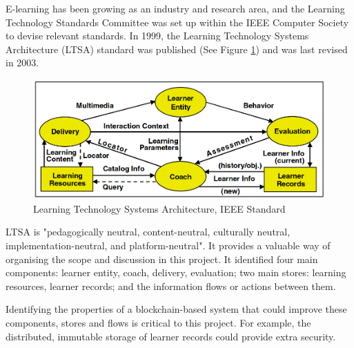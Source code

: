 E-learning has been growing as an industry and research area, and the Learning Technology Standards Committee
was set up within the IEEE Computer Society to devise relevant standards. In 1999, the Learning Technology
Systems Architecture (LTSA) standard was published (See Figure \ref{fig:LTSA}) and was last revised in 2003.

\begin{figure}[!ht]
	\centering
	\includegraphics[width=1.0\textwidth]{ltsa2003}
	\caption[Learning Technology Systems Architecture]
	{Learning Technology Systems Architecture, IEEE Standard \citep[p.9]{ieee2003ltsa}}
	\label{fig:LTSA}
\end{figure}

LTSA is "pedagogically neutral, content-neutral, culturally neutral, implementation-neutral,
and platform-neutral"\citep[p.1]{ieee2003ltsa}. It provides a valuable way of organising
the scope and discussion in this project. It identified four main components: learner entity, coach,
delivery, evaluation; two main stores: learning resources, learner records; and the information flows
or actions between them.

Identifying the properties of a blockchain-based system that could improve these components, stores and
flows is critical to this project. For example, the distributed, immutable storage of learner records could
provide extra security.




